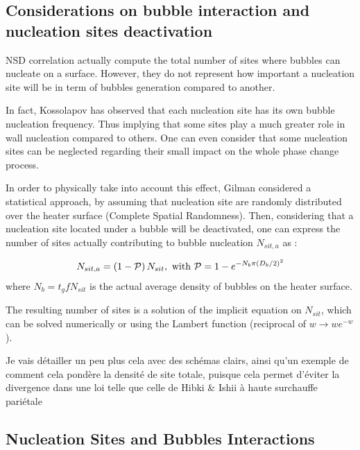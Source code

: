 \subsection{Considerations on bubble interaction and nucleation sites deactivation}

NSD correlation actually compute the total number of sites where bubbles can nucleate on a surface. However, they do not represent how important a nucleation site will be in term of bubbles generation compared to another. 

\npar
In fact, Kossolapov has observed that each nucleation site has its own bubble nucleation frequency. Thus implying that some sites play a much greater role in wall nucleation compared to others. One can even consider that some nucleation sites can be neglected regarding their small impact on the whole phase change process.

\npar

In order to physically take into account this effect, Gilman considered a statistical approach, by assuming that nucleation site are randomly distributed over the heater surface (Complete Spatial Randomness). Then, considering that a nucleation site located under a bubble will be deactivated, one can express the number of sites actually contributing to bubble nucleation $N_{sit,a}$ as :


\begin{align}
N_{sit,a}=\parth{1-\mathcal{P}}N_{sit},\ \text{with}\ \mathcal{P}=1-e^{-N_{b}\pi \parth{D_{b}/2}^{2}}
\end{align}
where $N_{b}=t_{g}fN_{sit}$ is the actual average density of bubbles on the heater surface.

\npar

The resulting number of sites is a solution of the implicit equation on $N_{sit}$, which can be solved numerically or using the Lambert function (reciprocal of $w\rightarrow we^{-w}$).

\npar

{\color{red} Je vais détailler un peu plus cela avec des schémas clairs, ainsi qu'un exemple de comment cela pondère la densité de site totale, puisque cela permet d'éviter la divergence dans une loi telle que celle de Hibki \& Ishii à haute surchauffe pariétale} 



\subsection{Nucleation Sites and Bubbles Interactions}


